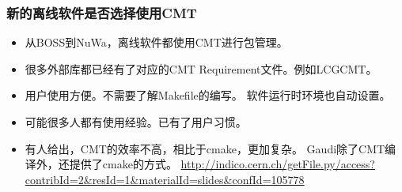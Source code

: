 \begin{frame}
    \frametitle{新的离线软件是否选择使用CMT}
    \begin{itemize}
        \item 从BOSS到NuWa，离线软件都使用CMT进行包管理。
        \item 很多外部库都已经有了对应的CMT Requirement文件。例如LCGCMT。
        \item 用户使用方便。不需要了解Makefile的编写。
              软件运行时环境也自动设置。
        \item 可能很多人都有使用经验。已有了用户习惯。
        \item 有人给出，CMT的效率不高，相比于cmake，更加复杂。
              Gaudi除了CMT编译外，还提供了cmake的方式。
              \url{http://indico.cern.ch/getFile.py/access?contribId=2\&resId=1\&materialId=slides\&confId=105778}
    \end{itemize}
\end{frame}
